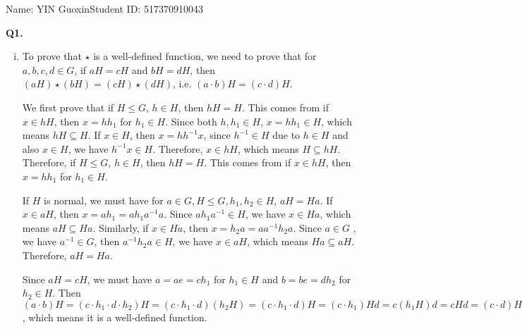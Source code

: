 \documentclass{article}[12pt]
\begin{document}
\noindent

\noindent{}
\begin{center}
\footnotesize{\quad Name: YIN Guoxin\quad Student ID: 517370910043}


\end{center}

\noindent \textbf{Q1.}
\begin{enumerate}[(i)]
\item 
To prove that $\star$ is a well-defined function, we need to prove that for $a,b,c,d\in G$, if $aH=cH$ and $bH=dH$, then $(aH)\star (bH)=(cH)\star (dH)$, i.e. $(a \cdot b) H=(c \cdot d) H$. 
\par We first prove that if $H\leq G$, $h\in H$, then $hH=H$. This comes from if $x\in hH$, then $x=hh_1$ for $h_1\in H$. Since both $h,h_1\in H$, $x=hh_1\in H$, which means $hH\subseteq H$. If $x\in H$, then $x=hh^{-1}x$, since $h^{-1}\in H$ due to $h\in H$ and also $x\in H$, we have $h^{-1}x\in H$. Therefore, $x\in hH$, which means $H\subseteq hH$. Therefore, if $H\leq G$, $h\in H$, then $hH=H$. This comes from if $x\in hH$, then $x=hh_1$ for $h_1\in H$.
\par If $H$ is normal, we must have for $a\in G,H\leq G, h_1,h_2\in H$, $aH=Ha$. If $x\in aH$, then $x=ah_1=ah_1a^{-1}a$. Since $ah_1a^{-1}\in H$, we have $x\in Ha$, which means $aH\subseteq Ha$. Similarly, if $x\in Ha$, then $x=h_2a=aa^{-1}h_2a$. Since $a\in G$ , we have $a^{-1}\in G$, then $a^{-1}h_2a\in H$, we have $x\in aH$, which means $Ha\subseteq aH$. Therefore, $aH=Ha$.
\par Since $aH=cH$, we must have $a=ae=ch_1$ for $h_1\in H$ and $b=be=dh_2$ for $h_2\in H$. Then $(a \cdot b) H=(c\cdot h_1\cdot d\cdot h_2)H=(c\cdot h_1\cdot d)(h_2H)=(c\cdot h_1\cdot d)H=(c\cdot h_1)Hd=c(h_1H)d=cHd=(c\cdot d)H$, which means it is a well-defined function.


\end{enumerate}
\end{document}
